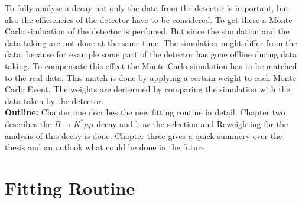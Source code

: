\documentclass[english]{uzhpub}
\begin{document}
To fully analyse a decay not only the data from the detector is important, but also the efficiencies of the detector have to be considered. To get these a Monte Carlo simluation of the detector is perfomed. But since the simulation and the data taking are not done at the same time. The simulation might differ from the data, because for example some part of the detector has gone offline during data taking. To compensate this effect the Monte Carlo simulation has to be matched to the real data. This match is done by applying a certain weight to each Monte Carlo Event. The weights are dertermed by comparing the simulation with the data taken by the detector. \\
\textbf{Outline:} Chapter one decribes the new fitting routine in detail. Chapter two describes the $B \rightarrow K^* \mu \mu$ decay and how the selection and Reweighting for the analysis of this decay is done. Chapter three gives a quick summery over the thesis and an outlook what could be done in the future.

\clearpage

\section{Fitting Routine}
\end{document}
